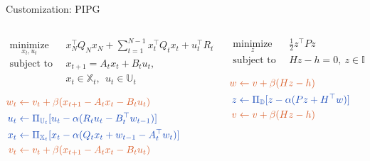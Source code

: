 \documentclass[aspectratio=169]{beamer}
\newcommand{\rtx}[1]{{\color{redorange}#1}}
\newcommand{\btx}[1]{{\color{royalblue}#1}}
\begin{document}
\begin{frame}{Customization: PIPG}

    \vspace{-1cm}

    \begin{columns}[T]
        \begin{column}{0.6\textwidth}
            \begin{equation*}
                \begin{aligned}
        \underset{x_t,u_t}{\operatorname{minimize}}~~~&~x_N^\top Q_N x_N+\sum_{t=1}^{N-1} x_t^\top Q_t x_t + u_t^\top R_t u_t\\
        \operatorname{subject~to}~&~x_{t+1} = A_t x_t + B_tu_t, \\
        &~x_t\in\mathbb{X}_t,~~u_t \in \mathbb{U}_t
                \end{aligned}
                \end{equation*}  
                
                \vspace{1cm}

            $\begin{aligned}
                \rtx{w_t \gets {}} & \rtx{v_t+\beta (x_{t+1}-A_tx_{t}-B_tu_{t})} \\
                \btx{u_{t} \gets {}} & \btx{\Pi_{\mathbb{U}_t} [u_{t}-\alpha(R_tu_{t}-B_t^\top w_{t-1})]}\\
                \btx{x_t \gets {}} & \btx{\Pi_{\mathbb{X}_t}[x_t-\alpha(Q_tx_t+ w_{t-1}-A_t^\top w_{t})]}\\
                \rtx{v_t \gets {}} & \rtx{v_t +\beta (x_{t+1}-A_tx_{t}-B_tu_{t})}
            \end{aligned}$        
        \end{column}
        \begin{column}{0.4\textwidth}
            \begin{equation*}
                \begin{aligned}
            \underset{z}{\operatorname{minimize}}~~~&~\frac{1}{2}z^\top P z \\
            \operatorname{subject~to}~&~Hz-h=0,~ z\in\mathbb{D}
                \end{aligned}
                \end{equation*}
                
                \vspace{2cm}

            $\begin{aligned}
                \rtx{w \gets {}}   & \rtx{v + \beta(Hz-h)}\\
                \btx{z \gets {}}   & \btx{\Pi_{\mathbb{D}}[z - \alpha (Pz + H^\top w)]}\\
                \rtx{v \gets {}}   & \rtx{v + \beta(Hz-h)}            
            \end{aligned}$
    \end{column}
    \end{columns}
\end{frame}
\end{document}
